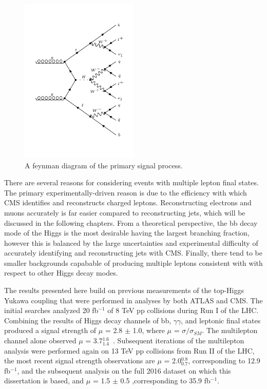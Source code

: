 \begin{figure}[hbtp]
 \begin{center}
   \includegraphics[width=0.5\textwidth]{ch1_figs/feynman_diagram_ttH_HWW_2lss.pdf}
   \caption{A feynman diagram of the primary signal process.}
   \label{fig:intro_feyn}
 \end{center}
\end{figure}

There are several reasons for considering \tth events with multiple lepton final states. The primary experimentally-driven reason is due to the efficiency with which
CMS identifies and reconstructs charged leptons. Reconstructing electrons and muons accurately is far easier compared to reconstructing jets,
which will be discussed in the following chapters. 
From a theoretical perspective, the bb decay mode of the Higgs is the most desirable having the largest branching fraction, however this is balanced by the large
uncertainties and experimental difficulty of accurately identifying and reconstructing jets with CMS.
Finally, there tend to be smaller backgrounds capabable of producing multiple leptons consistent with \tth with respect to other Higgs decay modes. 


The results presented here build on previous measurements of the top-Higgs Yukawa coupling that were performed in \tth analyses by both ATLAS and CMS.
The initial searches analyzed 20 fb$^{-1}$ of 8 TeV pp collisions during Run I of the LHC. Combining the results of Higgs decay channels of bb, $\gamma\gamma$,
and leptonic final states produced a signal strength of $\mu$ = 2.8 $\pm$ 1.0, where $\mu$ = $\sigma/\sigma_{SM}$. The multilepton channel alone
observed $\mu$ = 3.7$^{1.6}_{1.4}$~\cite{jhep_tth}. Subsequent iterations of the multilepton analysis were performed again on 13 TeV pp collisions from Run II
of the LHC, the most recent signal strength observations are $\mu$ = 2.0$^{0.8}_{0.7}$, corresponding to 12.9 fb$^{-1}$, and the subsequent analysis on the full
2016 dataset on which this dissertation is based, and $\mu$ = 1.5 $\pm$ 0.5 ,corresponding to 35.9 fb$^{-1}$.


%
% 
% 
